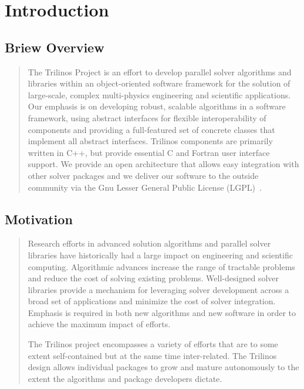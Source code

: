 \documentclass[12pt,relax]{SANDreport}
\begin{document}

%
    \section{Introduction}
	\subsection{Briew Overview}
	\begin{quote}
The Trilinos Project is an effort to develop parallel solver algorithms and 
libraries within 
an object-oriented software framework for the solution of large-scale, complex
multi-physics engineering and scientific applications.   Our emphasis is on 
developing robust, scalable algorithms in a software framework, using abstract 
interfaces for flexible interoperability of components and providing a 
full-featured set of concrete classes that implement all abstract interfaces. 
Trilinos components are primarily written in C++, but provide essential C and 
Fortran user interface support.  We provide an open architecture that allows 
easy integration with other solver packages and we deliver our software to 
the outside community via the Gnu Lesser General Public License
(LGPL)~\cite{gnu-license-site}.
	\end{quote}
	\subsection{Motivation}
	\begin{quote}
Research efforts in advanced solution algorithms and parallel solver
libraries have historically had a large impact on engineering and
scientific computing.  Algorithmic advances increase the range
of tractable problems and reduce the cost of solving existing
problems.  Well-designed solver libraries provide a mechanism for
leveraging solver development across a broad set of applications and
minimize the cost of solver integration.  Emphasis is
required in both new algorithms and new software in order
to achieve the maximum impact of efforts.

The Trilinos project encompasses a variety of efforts that are to some
extent self-contained but at the same time inter-related.  The
Trilinos design allows individual packages to grow and mature
autonomously to the extent the algorithms and package developers
dictate. 
	\end{quote}
\end{document}
